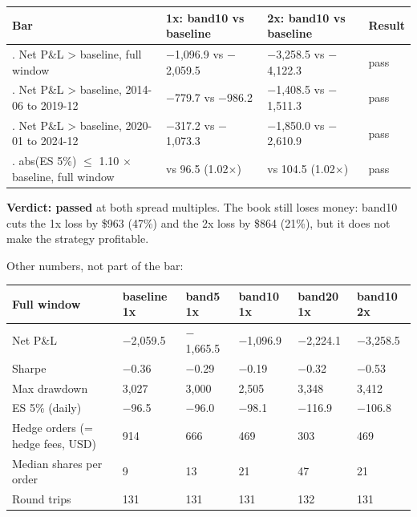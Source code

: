 \documentclass{article}
\begin{document}
\begin{center}\small
\begin{tabularx}{\linewidth}{>{\raggedright\arraybackslash}X >{\raggedright\arraybackslash}X >{\raggedright\arraybackslash}X l}
\toprule
\textbf{Bar} & \textbf{1x: band10 vs baseline} & \textbf{2x: band10 vs baseline} & \textbf{Result} \\
\midrule
1. Net P\&L > baseline, full window & \ensuremath{-}1,096.9 vs \ensuremath{-}2,059.5 & \ensuremath{-}3,258.5 vs \ensuremath{-}4,122.3 & pass \\
1. Net P\&L > baseline, 2014-06 to 2019-12 & \ensuremath{-}779.7 vs \ensuremath{-}986.2 & \ensuremath{-}1,408.5 vs \ensuremath{-}1,511.3 & pass \\
1. Net P\&L > baseline, 2020-01 to 2024-12 & \ensuremath{-}317.2 vs \ensuremath{-}1,073.3 & \ensuremath{-}1,850.0 vs \ensuremath{-}2,610.9 & pass \\
2. abs(ES 5\%) \ensuremath{\leq} 1.10 \ensuremath{\times} baseline, full window & 98.1 vs 96.5 (1.02\ensuremath{\times}) & 106.8 vs 104.5 (1.02\ensuremath{\times}) & pass \\
\bottomrule
\end{tabularx}
\end{center}

\textbf{Verdict: passed} at both spread multiples. The book still loses money: band10 cuts the 1x loss by \$963 (47\%) and the 2x loss by \$864 (21\%), but it does not make the strategy profitable.

Other numbers, not part of the bar:

\begin{center}\small
\begin{tabularx}{\linewidth}{>{\raggedright\arraybackslash}X l l l l l}
\toprule
\textbf{Full window} & \textbf{baseline 1x} & \textbf{band5 1x} & \textbf{band10 1x} & \textbf{band20 1x} & \textbf{band10 2x} \\
\midrule
Net P\&L & \ensuremath{-}2,059.5 & \ensuremath{-}1,665.5 & \ensuremath{-}1,096.9 & \ensuremath{-}2,224.1 & \ensuremath{-}3,258.5 \\
Sharpe & \ensuremath{-}0.36 & \ensuremath{-}0.29 & \ensuremath{-}0.19 & \ensuremath{-}0.32 & \ensuremath{-}0.53 \\
Max drawdown & 3,027 & 3,000 & 2,505 & 3,348 & 3,412 \\
ES 5\% (daily) & \ensuremath{-}96.5 & \ensuremath{-}96.0 & \ensuremath{-}98.1 & \ensuremath{-}116.9 & \ensuremath{-}106.8 \\
Hedge orders (= hedge fees, USD) & 914 & 666 & 469 & 303 & 469 \\
Median shares per order & 9 & 13 & 21 & 47 & 21 \\
Round trips & 131 & 131 & 131 & 132 & 131 \\
\bottomrule
\end{tabularx}
\end{center}
\end{document}
